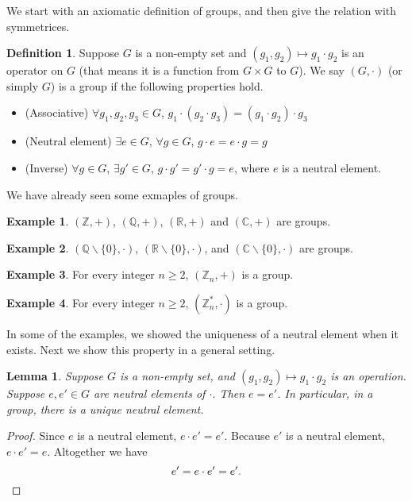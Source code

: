 \documentclass{article}
\theoremstyle{plain}
\newtheorem{lemma}{Lemma}
\theoremstyle{definition}
\newtheorem*{definition}{Definition}
\newtheorem{example}{Example}
\newcommand{\FR}{\mathbb{R}}
\begin{document}
We start with an axiomatic definition of groups, and then 
give the relation with symmetrices.
\begin{definition}
    Suppose $G$ is a non-empty set and $(g_1,g_2)\mapsto g_1\cdot g_2$
    is an operator on $G$ (that means it is a function from $G\times G$
    to $G$). We say $(G,\cdot)$ (or simply $G$) is a group if the 
    following properties hold.
    \begin{itemize}
        \item (Associative) $\forall g_1,g_2,g_3\in G$, $g_1\cdot (g_2\cdot g_3)=(g_1\cdot g_2)\cdot g_3$
        \item (Neutral element) $\exists e\in G$, $\forall g\in G$, $g\cdot e=e\cdot g=g$
        \item (Inverse) $\forall g\in G$, $\exists g'\in G$, $g\cdot g'=g'\cdot g=e$, where $e$ is a neutral element.
    \end{itemize}
\end{definition}

We have already seen some exmaples of groups.
\begin{example}
    $(\mathbb{Z},+)$, $(\mathbb{Q},+)$, $(\FR,+)$ and $(\mathbb{C},+)$ are groups.
\end{example}

\begin{example}
    $(\mathbb{Q}\backslash\{0\},\cdot)$, $(\FR\backslash\{0\},\cdot)$, and 
    $(\mathbb{C}\backslash\{0\},\cdot)$ are groups.
\end{example}

\begin{example}
    For every integer $n\geq 2$, $(\mathbb{Z}_n,+)$ is a group.
\end{example}

\begin{example}
    For every integer $n\geq 2$, $(\mathbb{Z}_n^*,\cdot)$ is a group.
\end{example}

In some of the examples, we showed the uniqueness
of a neutral element when it exists. Next we show
this property in a general setting.

\begin{lemma}
    Suppose $G$ is a non-empty set, and $(g_1,g_2)\mapsto g_1\cdot g_2$
    is an operation. Suppose $e,e'\in G$ are neutral
    elements of $\cdot$. Then $e=e'$. In particular,
    in a group, there is a unique neutral element.
\end{lemma}

\begin{proof}
    Since $e$ is a neutral element, $e\cdot e'=e'$.
    Because $e'$ is a neutral element, $e\cdot e'=e$.
    Altogether we have 
    \[e'=e\cdot e'=e'.\qedhere\]
\end{proof}
\end{document}
